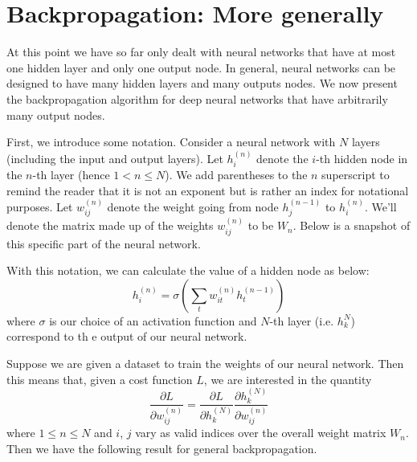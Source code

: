 \documentclass[12pt,letterpaper]{book}
\theoremstyle{definition}
\begin{document}
  
  \section{Backpropagation: More generally}
    At this point we have so far only dealt with neural networks that have at 
    most one hidden layer and only one output node. In general, neural networks can be designed 
    to have many hidden layers and many outputs nodes. We now present the backpropagation
    algorithm for deep neural networks that have arbitrarily many output nodes.

    First, we introduce some notation.
    Consider a neural network with $N$ layers (including the input and output layers).
    Let $h_i^{(n)}$ denote the $i$-th hidden node in the $n$-th layer (hence $1 < n \le N$).
    We add parentheses to the $n$ superscript to remind the reader that it is not an exponent
    but is rather an index for notational purposes.
    Let $w_{ij}^{(n)}$ denote the weight going from node 
    $h_j^{(n-1)}$ to $h_i^{(n)}$. We'll denote the 
    matrix made up of the weights $w_{ij}^{(n)}$ to be $W_n$.
    Below is a snapshot 
    of this specific part of the neural network.

    \begin{center}

    \end{center}
    With this notation, we can calculate the value of a hidden node as below:
    \[
      h_i^{(n)} = \sigma\left(\sum_{t}w^{(n)}_{it}h^{(n-1)}_t\right)
    \]
    where $\sigma$ is our choice of an activation function and 
      $N$-th layer (i.e. $h_k^N$) correspond to th
  e output of 
    our neural network.

    Suppose we are given a dataset to train the weights of our neural network. 
    Then this means that, given a cost function $L$, we are interested in the quantity
    \[
      \frac{\partial L}{\partial w_{ij}^{(n)}} = 
      \frac{\partial L}{\partial h_{k}^{(N)}} 
      \frac{\partial h_{k}^{(N)}}{\partial w_{ij}^{(n)}}
    \] 
    where $1 \le n \le N$ and $i$, $j$ vary as valid indices over the overall weight matrix 
    $W_n$. Then we have the following result for general backpropagation.
\end{document}

